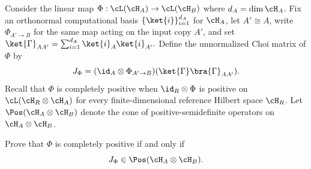 Consider the linear map $\Phi:\cL(\cH_A)\to\cL(\cH_B)$ where $d_A=\dim\cH_A$. Fix an orthonormal computational basis
$\{\ket{i}\}_{i=1}^{d_A}$ for $\cH_A$, let $A'\cong A$, write $\Phi_{A'\to B}$ for the same map acting on the input copy $A'$, and set $\ket{\Gamma}_{AA'}=\sum_{i=1}^{d_A}\ket{i}_A\ket{i}_{A'}.$
Define the unnormalized Choi matrix of $\Phi$ by
$$
J_{\Phi}
=
(\id_A\otimes\Phi_{A'\to B})
(\ket{\Gamma}\bra{\Gamma}_{AA'}).
$$
Recall that $\Phi$ is completely positive when $\id_R\otimes\Phi$ is positive on $\cL(\cH_R\otimes\cH_A)$ for every finite-dimensional reference Hilbert space $\cH_R$. Let $\Pos(\cH_A\otimes\cH_B)$ denote the cone of positive-semidefinite operators on $\cH_A\otimes\cH_B$.

Prove that $\Phi$ is completely positive if and only if
$$
J_{\Phi}\in\Pos(\cH_A\otimes\cH_B).
$$
